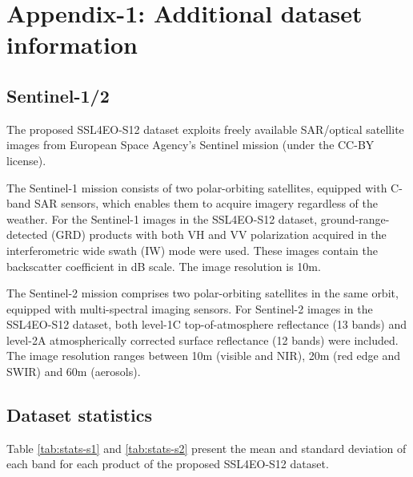\documentclass[lettersize,journal]{IEEEtran}
\begin{document}
\small{
\printbibliography[segment=0]
}








\onecolumn
\normalsize
\newrefsegment




\section*{\large\textbf{Appendix-1: Additional dataset information}}
\vspace{1em}



\subsection{\textbf{Sentinel-1/2}}
The proposed SSL4EO-S12 dataset exploits freely available SAR/optical satellite images from European Space Agency's Sentinel mission (under the CC-BY license). 

The Sentinel-1 mission \citep{torres2012gmes} consists of two polar-orbiting satellites, equipped with C-band SAR sensors, which enables them to acquire imagery regardless of the weather. For the Sentinel-1 images in the SSL4EO-S12 dataset, ground-range-detected (GRD) products with both VH and VV polarization acquired in the interferometric wide swath (IW) mode were used. These images contain the  backscatter coefficient in dB scale. The image resolution is 10m.

The Sentinel-2 mission \citep{drusch2012sentinel} comprises two polar-orbiting satellites in the same orbit, equipped with multi-spectral imaging sensors. For Sentinel-2 images in the SSL4EO-S12 dataset, both level-1C top-of-atmosphere reflectance (13 bands) and level-2A atmospherically corrected surface reflectance (12 bands) were included. The image resolution ranges between 10m (visible and NIR), 20m (red edge and SWIR) and 60m (aerosols).

\subsection{\textbf{Dataset statistics}} Table \ref{tab:stats-s1} and \ref{tab:stats-s2} present the mean and standard deviation of each band for each product of the proposed SSL4EO-S12 dataset.


\begin{table}[h]
\caption{Statistics of Sentinel-1 images in the SSL4EO-S12 dataset.}
\label{tab:stats-s1}
\centering

\end{table}
\vspace{-1em}
\end{document}
